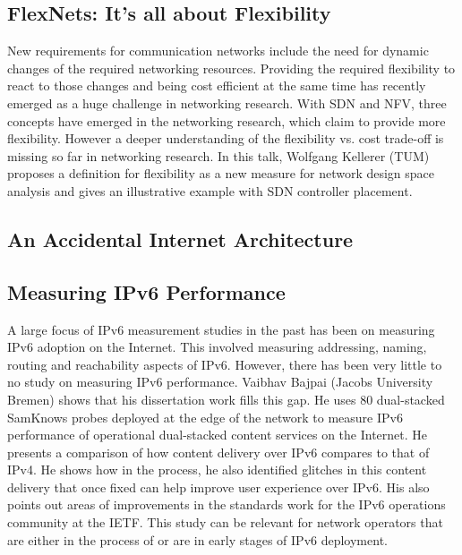 \subsection{FlexNets: It's all about Flexibility}

New requirements for communication networks include the need for dynamic
changes of the required networking resources. Providing the required
flexibility to react to those changes and being cost efficient at the same
time has recently emerged as a huge challenge in networking research. With
\ac{SDN} and \ac{NFV}, three concepts have emerged in the networking research,
which claim to provide more flexibility. However a deeper understanding of the
flexibility vs. cost trade-off is missing so far in networking research. In
this talk, Wolfgang Kellerer (TUM) proposes a definition for flexibility as a
new measure for network design space analysis \cite{wkellerer:infocom:2016}
and gives an illustrative example with \ac{SDN} controller placement.

\subsection{An Accidental Internet Architecture}


\subsection{Measuring IPv6 Performance}

A large focus of IPv6 measurement studies in the past has been on measuring
IPv6 adoption on the Internet. This involved measuring addressing, naming,
routing and reachability aspects of IPv6.  However, there has been very little
to no study on measuring IPv6 performance. Vaibhav Bajpai (Jacobs University
Bremen) shows that his dissertation work fills this gap. He uses 80
dual-stacked SamKnows \cite{vbajpai:comst:2015} probes deployed at the edge of
the network to measure IPv6 performance of operational dual-stacked content
services on the Internet.  He presents a comparison of how content delivery
\cite{vbajpai:networking:2015, sahsan:pam:2015} over IPv6 compares to that of
IPv4. He shows how in the process, he also identified glitches in this content
delivery \cite{seravuchira:cnsm:2016} that once fixed can help improve user
experience over IPv6. His also points out areas of improvements
\cite{vbajpai:anrw:2016} in the standards work for the IPv6 operations
community at the IETF. This study can be relevant for network operators that
are either in the process of or are in early stages of IPv6 deployment.


